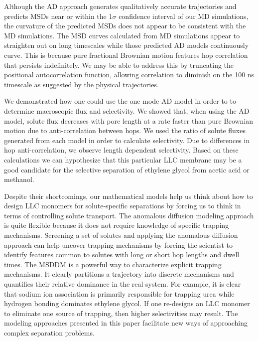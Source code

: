 \documentclass[aps,pre,preprint,groupedaddress,longbibliography]{revtex4-2}
\begin{document}
  Although the AD approach generates qualitatively accurate trajectories and
  predicts MSDs near or within the 1$\sigma$ confidence interval of our MD
  simulations, the curvature of the predicted MSDs does not appear to be
  consistent with the MD simulations. The MSD curves calculated from MD
  simulations appear to straighten out on long timescales while those predicted
  AD models continuously curve. This is because pure fractional Brownian motion
  features hop correlation that persists indefinitely. We may be able to
  address this by truncating the positional autocorrelation function, allowing
  correlation to diminish on the 100 ns timescale as suggested by the physical
  trajectories.

  We demonstrated how one could use the one mode AD model in order to to
  determine macroscopic flux and selectivity. We showed that, when using the AD
  model, solute flux decreases with pore length at a rate faster than pure
  Brownian motion due to anti-correlation between hops. We used the ratio of
  solute fluxes generated from each model in order to calculate selectivity.
  Due to differences in hop anti-correlation, we observe length dependent
  selectivity. Based on these calculations we can hypothesize that this
  particular LLC membrane may be a good candidate for the selective separation
  of ethylene glycol from acetic acid or methanol.
  
  Despite their shortcomings, our mathematical models help us think about how
  to design LLC monomers for solute-specific separations by forcing us to think
  in terms of controlling solute transport. The anomalous diffusion modeling
  approach is quite flexible because it does not require knowledge of specific
  trapping mechanisms. Screening a set of solutes and applying the anomalous
  diffusion approach can help uncover trapping mechanisms by forcing the
  scientist to identify features common to solutes with long or short hop
  lengths and dwell times. 
  The MSDDM is a powerful way to characterize explicit
  trapping mechanisms. It clearly partitions a trajectory into discrete
  mechanisms and quantifies their relative dominance in the real system. For
  example, it is clear that sodium ion association is primarily responsible for
  trapping urea while hydrogen bonding dominates ethylene glycol. If one
  re-designs an LLC monomer to eliminate one source of trapping, then 
  higher selectivities may result. The modeling approaches presented in this paper 
  facilitate new ways of approaching complex separation problems.
  
\end{document}
